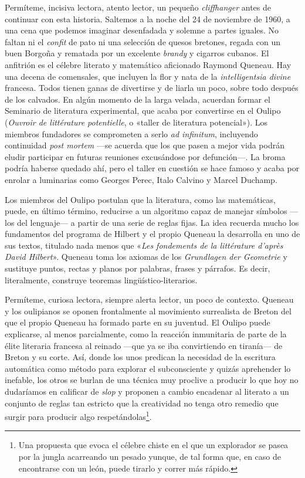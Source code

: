 \documentclass[11pt,a4paper]{article}
\begin{document}
Permíteme, incisiva lectora, atento lector, un pequeño \emph{cliffhanger} antes de continuar con esta historia. Saltemos a la noche del 24 de noviembre de 1960, a una cena que podemos imaginar desenfadada y solemne a partes iguales. No faltan ni el \emph{confit} de pato ni una selección de quesos bretones, regada con un buen Borgoña y rematada por un excelente \emph{brandy} y cigarros cubanos. El anfitrión es el célebre literato y matemático aficionado Raymond Queneau. Hay una decena de comensales, que incluyen la flor y nata de la \emph{intelligentsia divine} francesa. 
Todos tienen ganas de divertirse y de liarla un poco, sobre todo después de los calvados. En algún momento de la larga velada, acuerdan formar el Seminario de literatura experimental, que acaba por convertirse en el Oulipo (\emph{Ouvroir de littérature potentielle}, o «taller de literatura potencial»). Los miembros fundadores se comprometen a serlo \emph{ad infinitum}, incluyendo continuidad \emph{post mortem} ---se acuerda que los que pasen a mejor vida podrán eludir participar en futuras reuniones excusándose por defunción---. La broma podría haberse quedado ahí, pero el taller en cuestión se hace famoso y acaba por enrolar a luminarias como Georges Perec, Italo Calvino y Marcel Duchamp.

Los miembros del Oulipo postulan que la literatura, como las matemáticas, puede, en último término, reducirse a un algoritmo capaz de manejar símbolos ---los del lenguaje--- a partir de una serie de reglas fijas. La idea recuerda mucho los fundamentos del programa de Hilbert y el propio Queneau la desarrolla en uno de sus textos, titulado nada menos que «\emph{Les fondements de la littérature d'après David Hilbert}». Queneau toma los axiomas de los \emph{Grundlagen der Geometrie} y sustituye puntos, rectas y planos por palabras, frases y párrafos. Es decir, literalmente, construye teoremas lingüístico-literarios.

Permíteme, curiosa lectora, siempre alerta lector, un poco de contexto. Queneau y los oulipianos se oponen frontalmente al movimiento surrealista de Breton del que el propio Queneau ha formado parte en su juventud. El Oulipo puede explicarse, al menos parcialmente, como la reacción inmunitaria de parte de la élite literaria francesa al reinado ---que ya se iba convirtiendo en tiranía--- de Breton y su corte. Así, donde los unos predican la necesidad de la escritura automática como método para explorar el subconsciente y quizás aprehender lo inefable, los otros se burlan de una técnica muy proclive a producir lo que hoy no dudaríamos en calificar de \emph{slop} y proponen a cambio encadenar al literato a un conjunto de reglas tan estricto que la creatividad no tenga otro remedio que surgir para producir algo respetándolas\footnote{Una propuesta que evoca el célebre chiste en el que un explorador se pasea por la jungla acarreando un pesado yunque, de tal forma que, en caso de encontrarse con un león, puede tirarlo y correr más rápido.}.
\end{document}
